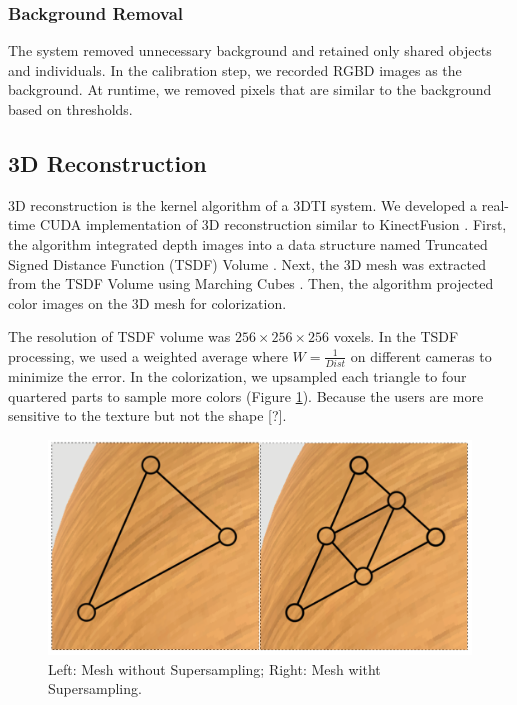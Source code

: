 \subsubsection{Background Removal}

The system removed unnecessary background and retained only shared objects and individuals. In the calibration step, we recorded RGBD images as the background. At runtime, we removed pixels that are similar to the background based on thresholds.

\subsection{3D Reconstruction}

3D reconstruction is the kernel algorithm of a 3DTI system. We developed a real-time CUDA implementation of 3D reconstruction similar to KinectFusion \cite{izadi2011kinectfusion}. First, the algorithm integrated depth images into a data structure named Truncated Signed Distance Function (TSDF) Volume \cite{curless1996volumetric}. Next, the 3D mesh was extracted from the TSDF Volume using Marching Cubes \cite{lorensen1987marching}. Then, the algorithm projected color images on the 3D mesh for colorization.

The resolution of TSDF volume was $256 \times 256 \times 256$ voxels. In the TSDF processing, we used a weighted average where $W = \frac{1}{Dist}$ on different cameras to minimize the error. In the colorization, we upsampled each triangle to four quartered parts to sample more colors (Figure \ref{fig:color_upsampling}). Because the users are more sensitive to the texture but not the shape [?].

\begin{figure}[H]
\centering
\includegraphics[width=0.8\linewidth]{figures/figure_mc.png}
\caption{Left: Mesh without Supersampling; Right: Mesh witht Supersampling.}
\label{fig:color_upsampling}
\end{figure}

